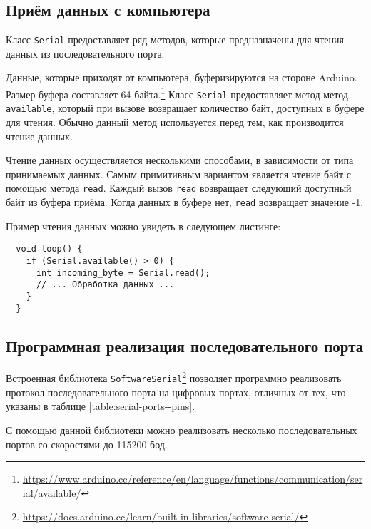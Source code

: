\documentclass[../sparc.tex]{subfiles}
\begin{document}
\subsection{Приём данных с компьютера}

Класс \texttt{Serial} предоставляет ряд методов, которые предназначены для
чтения данных из последовательного порта.

Данные, которые приходят от компьютера, буферизируются на стороне Arduino.
Размер буфера составляет 64
байта.\footnote{\url{https://www.arduino.cc/reference/en/language/functions/communication/serial/available/}}
Класс \texttt{Serial} предоставляет метод метод \texttt{available}, который при
вызове возвращает количество байт, доступных в буфере для чтения.  Обычно данный
метод используется перед тем, как производится чтение данных.

Чтение данных осуществляется несколькими способами, в зависимости от типа
принимаемых данных.  Самым примитивным вариантом является чтение байт с помощью
метода \texttt{read}.  Каждый вызов \texttt{read} возвращает следующий доступный
байт из буфера приёма.  Когда данных в буфере нет, \texttt{read} возвращает
значение -1.

Пример чтения данных можно увидеть в следующем листинге:

\begin{verbatim}
  void loop() {
    if (Serial.available() > 0) {
      int incoming_byte = Serial.read();
      // ... Обработка данных ...
    }
  }
\end{verbatim}

\subsection{Программная реализация последовательного порта}

Встроенная библиотека
\texttt{SoftwareSerial}\footnote{\url{https://docs.arduino.cc/learn/built-in-libraries/software-serial/}}
позволяет программно реализовать протокол последовательного порта на цифровых
портах, отличных от тех, что указаны в таблице \ref{table:serial-ports--pins}.

С помощью данной библиотеки можно реализовать несколько последовательных портов
со скоростями до 115200 бод.
\end{document}
